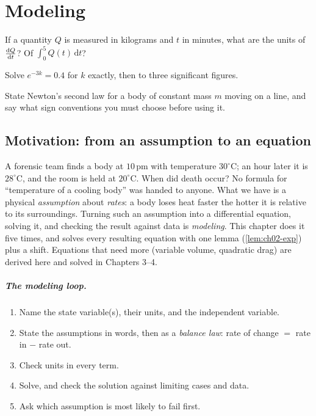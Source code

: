 \chapter{Modeling}\label{ch:ch02}

\begin{diagnostic}
  \item If a quantity $Q$ is measured in kilograms and $t$ in minutes, what
        are the units of $\frac{\mathrm{d}Q}{\mathrm{d}t}$? Of $\int_0^5 Q(t)\,\mathrm{d}t$?
  \item Solve $e^{-3k} = 0.4$ for $k$ exactly, then to three significant
        figures.
  \item State Newton's second law for a body of constant mass $m$ moving on a
        line, and say what sign conventions you must choose before using it.
\end{diagnostic}

\section{Motivation: from an assumption to an equation}\label{sec:ch02-motivation}

A forensic team finds a body at $10$\,pm with temperature $30^\circ$C; an hour
later it is $28^\circ$C, and the room is held at $20^\circ$C. When did death
occur? No formula for ``temperature of a cooling body'' was handed to anyone.
What we have is a physical \emph{assumption} about \emph{rates}: a body loses
heat faster the hotter it is relative to its surroundings. Turning such an
assumption into a differential equation, solving it, and checking the result
against data is \emph{modeling}. This chapter does it five times, and solves
every resulting equation with one lemma (\cref{lem:ch02-exp}) plus a shift.
Equations that need more (variable volume, quadratic drag) are derived here
and solved in Chapters 3--4.

\paragraph{The modeling loop.}
\begin{enumerate}[label=(\arabic*)]
  \item Name the state variable(s), their units, and the independent variable.
  \item State the assumptions in words, then as a \emph{balance law}:
        rate of change $=$ rate in $-$ rate out.
  \item Check units in every term.
  \item Solve, and check the solution against limiting cases and data.
  \item Ask which assumption is most likely to fail first.
\end{enumerate}

